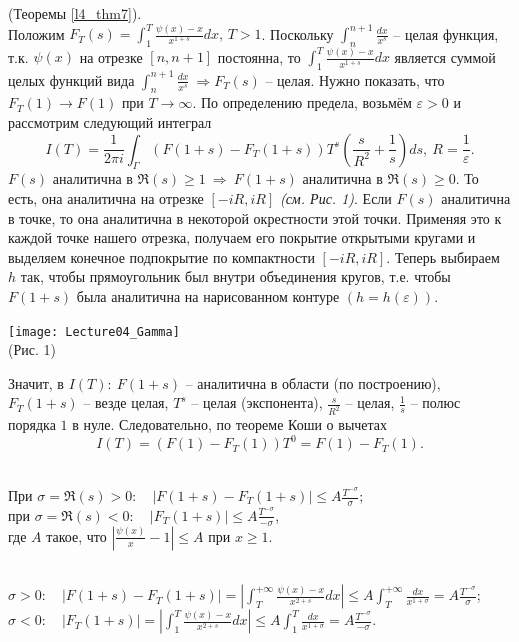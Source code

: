 \begin{pf} (Теоремы \ref{l4_thm7}).\\
	Положим $\displaystyle F_T(s) = \int_1^T \frac{\psi(x)-x}{x^{1+s}}dx, \, T>1$. Поскольку $\displaystyle \int_n^{n+1}\frac{dx}{x^s}$ -- целая функция, т.к. $\psi(x)$ на отрезке $[n, n+1]$ постоянна, то $\displaystyle \int_1^T \frac{\psi(x)-x}{x^{1+s}}dx$ является суммой целых функций вида $\displaystyle \int_n^{n+1}\frac{dx}{x^s} \ \Rightarrow F_T(s)$ -- целая. Нужно показать, что $F_T(1) \to F(1)$ при $T \to \infty$. По определению предела, возьмём $\varepsilon > 0$ и  рассмотрим следующий интеграл
	$$I(T) = \frac{1}{2\pi i}\int_\Gamma \left( F(1+s)-F_T(1+s) \right)T^s\left(\frac{s}{R^2}+\frac{1}{s}\right)ds, \ R = \frac{1}{\varepsilon}.$$
	$F(s)$ аналитична в $\Re(s) \geq 1 \ \Rightarrow \ F(1+s)$ аналитична в $\Re(s) \geq 0$. То есть, она аналитична на отрезке $[-iR, iR]$ \textit{(см. Рис. 1)}. Если $F(s)$ аналитична в точке, то она аналитична в некоторой окрестности этой точки. Применяя это к каждой точке нашего отрезка, получаем его покрытие открытыми кругами и выделяем конечное подпокрытие по компактности $[-iR, iR]$. Теперь выбираем $h$ так, чтобы прямоугольник был внутри объединения кругов, т.е. чтобы $F(1+s)$ была аналитична на нарисованном контуре $(h=h(\varepsilon))$.
	\begin{center}
		\texttt{[image: Lecture04\_Gamma]}~\\
		(Рис. 1)
	\end{center}
	Значит, в $I(T): \ F(1+s)$ -- аналитична в области (по построению), $F_T(1+s)$ -- везде целая, $T^s$ -- целая (экспонента), $\displaystyle \frac{s}{R^2}$ -- целая, $\displaystyle \frac{1}{s}$ -- полюс порядка $1$ в нуле. Следовательно, по теореме Коши о вычетах
	$$I(T) = \left(F(1)-F_T(1)\right)T^0 = F(1)-F_T(1).$$
\end{pf}

\begin{lemma} \label{l4_lm13}~\\
	При $\displaystyle \sigma = \Re(s)>0: \quad \lvert F(1+s)-F_T(1+s) \rvert \leq A\frac{T^{-\sigma}}{\sigma}$;\\
	при $\displaystyle \sigma = \Re(s)<0: \quad \lvert F_T(1+s) \rvert \leq A\frac{T^{-\sigma}}{-\sigma}$,\\
	где $A$ такое, что $\displaystyle \left| \frac{\psi(x)}{x}-1 \right| \leq A$ при $x \geq 1$.
\end{lemma}
\begin{pf}~\\
	$\displaystyle \sigma>0: \quad \left| F(1+s)-F_T(1+s) \right| = \left| \int_T^{+\infty}\frac{\psi(x)-x}{x^{2+s}}dx \right| \leq A\int_T^{+\infty}\frac{dx}{x^{1+\sigma}} = A\frac{T^{-\sigma}}{\sigma}$;\\
	$\displaystyle \sigma<0: \quad \left| F_T(1+s) \right| = \left| \int_1^T\frac{\psi(x)-x}{x^{2+s}}dx \right| \leq A\int_1^T\frac{dx}{x^{1+\sigma}} = A\frac{T^{-\sigma}}{-\sigma}$.
\end{pf}